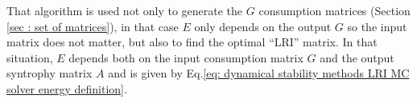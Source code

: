 \documentclass[12pt, titlepage]{report}
\begin{document}
That algorithm is used not only to generate the $G$ consumption matrices (Section \ref{sec : set of matrices}), in that case $E$ only depends on the output $G$ so the input matrix does not matter, but also to find the optimal ``LRI'' matrix. In that situation, $E$ depends both on the input consumption matrix $G$ and the output syntrophy matrix $A$ and is given by Eq.\eqref{eq: dynamical stability methods LRI MC solver energy definition}.



\end{document}
